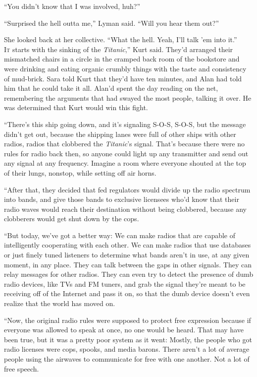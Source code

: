 \documentclass{article}
\begin{document}
``You didn't know that I was involved, huh?''

``Surprised the hell outta me,'' Lyman said.  ``Will you hear them
out?''

She looked back at her collective.  ``What the hell.  Yeah, I'll talk
'em into it.''
\\
\lettrine[lines=3, lhang=.5, nindent=0pt, findent=2pt]{I}{t}
starts with the sinking of the \textit{Titanic},'' Kurt said. 
They'd arranged their mismatched chairs in a circle in the cramped
back room of the bookstore and were drinking and eating organic
crumbly things with the taste and consistency of mud-brick.  Sara told
Kurt that they'd have ten minutes, and Alan had told him that he could
take it all.  Alan'd spent the day reading on the net, remembering the
arguments that had swayed the most people, talking it over.  He was
determined that Kurt would win this fight.

``There's this ship going down, and it's signaling S-O-S, S-O-S, but
the message didn't get out, because the shipping lanes were full of
other ships with other radios, radios that clobbered the
\textit{Titanic}'s signal.  That's because there were no rules for
radio back then, so anyone could light up any transmitter and send out
any signal at any frequency.  Imagine a room where everyone shouted at
the top of their lungs, nonstop, while setting off air horns.

``After that, they decided that fed regulators would divide up the
radio spectrum into bands, and give those bands to exclusive licensees
who'd know that their radio waves would reach their destination
without being clobbered, because any clobberers would get shut down by
the cops.

``But today, we've got a better way:  We can make radios that are
capable of intelligently cooperating with each other.  We can make
radios that use databases or just finely tuned listeners to determine
what bands aren't in use, at any given moment, in any place.  They can
talk between the gaps in other signals.  They can relay messages for
other radios.  They can even try to detect the presence of dumb radio
devices, like TVs and FM tuners, and grab the signal they're meant to
be receiving off of the Internet and pass it on, so that the dumb
device doesn't even realize that the world has moved on.

``Now, the original radio rules were supposed to protect free
expression because if everyone was allowed to speak at once, no one
would be heard.  That may have been true, but it was a pretty poor
system as it went:  Mostly, the people who got radio licenses were
cops, spooks, and media barons.  There aren't a lot of average people
using the airwaves to communicate for free with one another.  Not a
lot of free speech.
\end{document}
